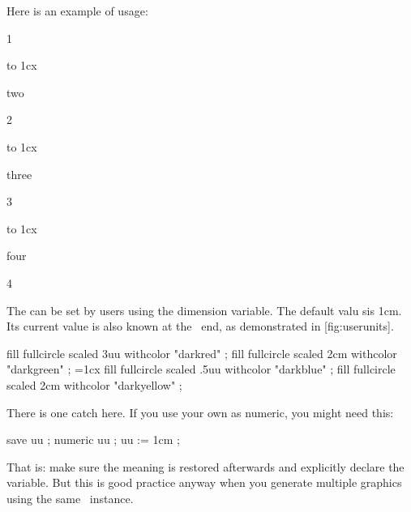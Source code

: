 Here is an example of usage:

\startbuffer
{}   {1}
    { to 1cx{\strut two}}   {2}
    { to 1cx{\strut three}} {3}
    { to 1cx{\strut four}}  {4}
\stopcombination
\stopbuffer


\startplacefigure[title=A map of available units,reference=fig:unitsmap]
    \framed[offset=1ex]{\showunitsmap}
\stopplacefigure

\typebuffer[option=TEX]

\startlinecorrection
\getbuffer
\stoplinecorrection

The  can be set by users using the \type {\uunit} dimension variable.
The default valu sis 1cm. Its current value is also known at the \METAPOST\ end,
as demonstrated in  [fig:userunits].

\startbuffer
\startcombination[nx=2,ny=1]
    \startcontent
        \uunit=1cm
        \framed[offset=1uu]
            \bgroup
                \startMPcode
                    fill fullcircle scaled 3uu withcolor "darkred"   ;
                    fill fullcircle scaled 2cm withcolor "darkgreen" ;
                \stopMPcode
            \egroup
    \stopcontent
    \startcaption
        \type {\uunit = 1cm}
    \stopcaption
    \startcontent
        \uunit=1cx
        \framed[offset=.1uu]
            \bgroup
                \startMPcode
                    fill fullcircle scaled .5uu withcolor "darkblue"   ;
                    fill fullcircle scaled  2cm withcolor "darkyellow" ;
                \stopMPcode
            \egroup
    \stopcontent
    \startcaption
    \stopcaption
\stopcombination
\stopbuffer


\typebuffer[option=TEX]

There is one catch here. If you use your own  as numeric, you might
need this:

\starttyping[option=MP]
save uu ; numeric uu ; uu := 1cm ;
\stoptyping

That is: make sure the meaning is restored afterwards and explicitly declare the
variable. But this is good practice anyway when you generate multiple graphics
using the same \METAPOST\ instance.

\startplacefigure[reference=fig:userunits,title={Shared user units in \TEX\ and \METAFUN.}]
    \getbuffer
\stopplacefigure

\stopsectionlevel

\page

\stopdocument
